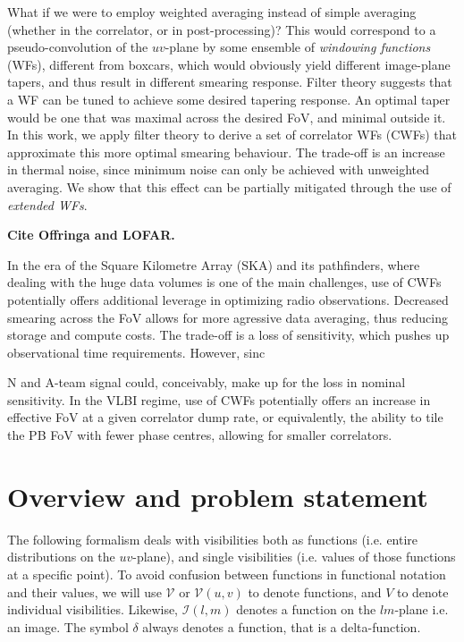 \documentclass[useAMS,usenatbib]{mn2e}
\begin{document}
What if we were to employ weighted averaging instead of simple averaging (whether in the correlator, or in post-processing)? 
This would correspond to a  pseudo-convolution of the $uv$-plane by some ensemble of \emph{windowing functions} (WFs), 
different from boxcars, which would obviously yield different image-plane tapers, and thus result in different 
smearing response. Filter theory suggests that a WF can be tuned to achieve some desired tapering response. 
An optimal taper would be one that was maximal across the desired FoV, and minimal outside it. In this work, 
we apply filter theory to derive a set of correlator WFs (CWFs) that approximate this more optimal smearing 
behaviour. The trade-off is an increase in thermal noise, since minimum noise can only be achieved with 
unweighted averaging. We show that this effect can be partially mitigated through the use of \emph{extended WFs}. 

{\bf Cite Offringa and LOFAR.}

In the era of the Square Kilometre Array (SKA) and its pathfinders, where dealing with the huge data volumes is one of
the main challenges, use of CWFs potentially offers additional leverage in optimizing radio observations. 
Decreased smearing across the FoV allows for more agressive data averaging, thus reducing storage and compute costs. 
The trade-off is a loss of sensitivity, which pushes up observational time requirements. However, sinc

 N and A-team signal 
could, conceivably, make up for the loss in nominal sensitivity. In the VLBI regime, use of CWFs potentially offers an increase in 
effective FoV at a given correlator dump rate, or equivalently, the ability to tile the PB FoV with fewer phase centres, allowing
for smaller correlators.

\section{Overview and problem statement}

\newcommand{\VV}{\mathcal{V}}
\newcommand{\WW}{\mathcal{W}}
\newcommand{\II}{\mathcal{I}}
\newcommand{\IID}{\mathcal{I}^\mathrm{D}}
\newcommand{\IIDI}{\mathcal{I}^\mathrm{DI}}
\newcommand{\EE}{\mathcal{E}}
\newcommand{\FF}{\mathcal{F}}
\newcommand{\HH}{\mathcal{H}}
\newcommand{\TT}{\mathcal{T}}
\newcommand{\uu}{\bmath{u}}

The following formalism deals with visibilities both as functions (i.e. entire distributions on the $uv$-plane), 
and single visibilities (i.e. values of those functions at a specific point). To avoid confusion between functions in
functional notation and their values, we will use $\VV$ or 
$\VV(u,v)$ to denote functions, and $V$ to denote individual visibilities. Likewise, $\II(l,m)$ denotes a function 
on the $lm$-plane i.e. an image. The symbol $\delta$ always denotes a function, that is a delta-function.
\end{document}
